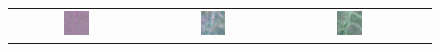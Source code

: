 \begin{figure}[h!]
    \centering
    \setlength{\tabcolsep}{2pt} %
    \renewcommand{\arraystretch}{1.0} %

    \begin{tabular}{c *{3}{c}}
        
        \includegraphics[width=0.2\textwidth, height=0.2\textheight, keepaspectratio]{img/limitation_noise/sample_000071_sar_pseudo.png} &
        \includegraphics[width=0.2\textwidth, height=0.2\textheight, keepaspectratio]{img/limitation_noise/sample_000071_pred_rgb.png} &
        \includegraphics[width=0.2\textwidth, height=0.2\textheight, keepaspectratio]{img/limitation_noise/sample_000071_true_rgb.png} \\
        

\end{tabular}
\end{figure}
